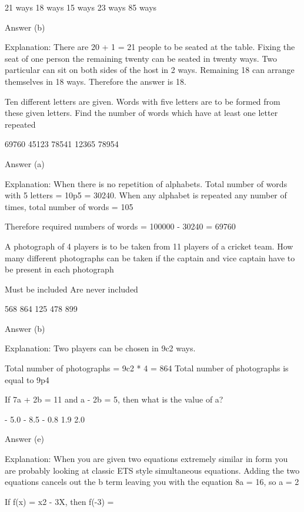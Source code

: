         21 ways
        18 ways
        15 ways
        23 ways
        85 ways 

    Answer (b)

    Explanation: There are 20 + 1 = 21 people to be seated at the table. Fixing the seat of one person the remaining twenty can be seated in twenty ways. Two particular can  sit on both sides of the host in 2 ways. Remaining 18 can arrange themselves in 18 ways. Therefore the answer is 18.

    Ten different letters are given. Words with five letters are to be formed from these given letters. Find the number of words which have at least one letter repeated

        69760
        45123
        78541
        12365
        78954 

    Answer (a)

    Explanation: When there is no repetition of alphabets. Total number of words with 5 letters = 10p5 = 30240. When any alphabet is repeated any number of times, total number of words = 105

    Therefore required numbers of words = 100000 - 30240 = 69760

    A photograph of 4 players is to be taken from 11 players of a cricket team. How many different photographs can be taken if the captain and vice captain have to be present in each photograph

        Must be included
        Are never included 

        568
        864
        125
        478
        899 

    Answer (b)

    Explanation: Two players can be chosen in 9c2 ways.

        Total number of photographs = 9c2 * 4 = 864
        Total number of photographs is equal to 9p4 



If 7a + 2b = 11 and a - 2b = 5, then what is the value of a?

    - 5.0
    - 8.5
    - 0.8
    1.9
    2.0 

Answer (e)

Explanation: When you are given two equations extremely similar in form you are probably looking at classic ETS style simultaneous equations. Adding the two equations cancels out the b term leaving you with the equation 8a = 16, so a = 2

If f(x) = x2 - 3X, then f(-3) =

